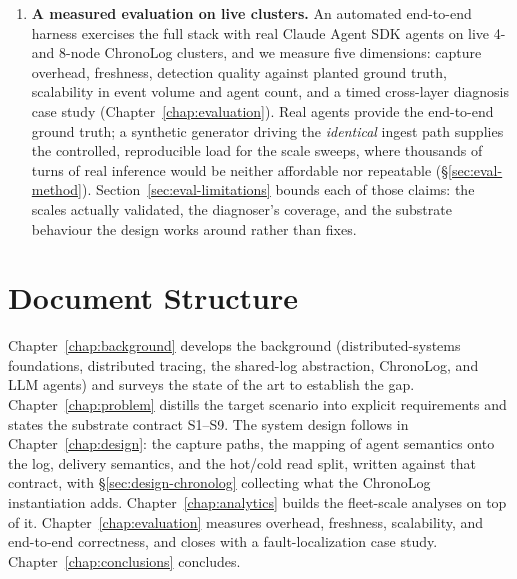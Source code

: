 \begin{enumerate}
  names the bottleneck hop by \emph{self-time}, its latency minus its
  slowest child's (Chapter~\ref{chap:analytics}).
\item \textbf{A measured evaluation on live clusters.} An automated
  end-to-end harness exercises the full stack with real Claude Agent SDK
  agents on live 4- and 8-node ChronoLog clusters, and we measure
  five dimensions: capture overhead, freshness, detection quality against
  planted ground truth, scalability in event volume and agent count, and
  a timed cross-layer diagnosis case study
  (Chapter~\ref{chap:evaluation}).
  Real agents provide the end-to-end ground truth; a synthetic generator
  driving the \emph{identical} ingest path supplies the controlled,
  reproducible load for the scale sweeps, where thousands of turns of real
  inference would be neither affordable nor repeatable
  (\S\ref{sec:eval-method}).
  Section~\ref{sec:eval-limitations} bounds each of those claims: the
  scales actually validated, the diagnoser's coverage, and the substrate
  behaviour the design works around rather than fixes.
\end{enumerate}

\section{Document Structure}
\label{sec:intro-structure}

Chapter~\ref{chap:background} develops the background (distributed-systems
foundations, distributed tracing, the shared-log abstraction, ChronoLog, and
LLM agents) and surveys the state of the art to establish the gap.
Chapter~\ref{chap:problem} distills the target scenario into explicit
requirements and states the substrate contract S1--S9. The system design
follows in Chapter~\ref{chap:design}: the
capture paths, the mapping of agent semantics onto the log, delivery
semantics, and the hot/cold read split, written against that contract, with
\S\ref{sec:design-chronolog} collecting what the ChronoLog instantiation
adds. Chapter~\ref{chap:analytics} builds
the fleet-scale analyses on top of it. Chapter~\ref{chap:evaluation}
measures overhead, freshness, scalability, and end-to-end correctness, and
closes with a fault-localization case study. Chapter~\ref{chap:conclusions}
concludes.
